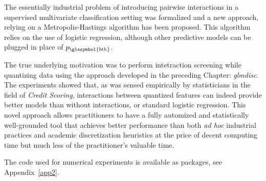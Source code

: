 The essentially industrial problem of introducing pairwise interactions in a supervised multivariate classification setting was formalized and a new approach, relying on a Metropolis-Hastings algorithm has been proposed. This algorithm relies on the use of logistic regression, although other predictive models can be plugged in place of $p_{\glssymbol{bth}}$.

The true underlying motivation was to perform intetraction screening while quantizing data using the approach developed in the preceding Chapter: \textit{glmdisc}.
The experiments showed that, as was sensed empirically by statisticians in the field of \textit{Credit Scoring}, interactions between quantized features can indeed provide better models than without interactions, or standard logistic regression. This novel approach allows practitioners to have a fully automized and statistically well-grounded tool that achieves better performance than both \textit{ad hoc} industrial practices and academic discretization heuristics at the price of decent computing time but much less of the practitioner's valuable time.

The code used for numerical experiments is available as packages, see Appendix~\ref{app2}.














\printbibliography[heading=subbibliography, title=References of Chapter 4]
